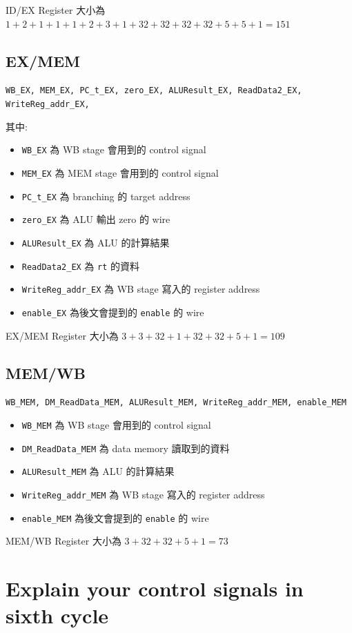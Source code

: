 \documentclass[twocolumn]{extarticle}
\begin{document}
ID/EX Register 大小為 $1+2+1+1+1+2+3+1+32+32+32+32+5+5+1 = 151$

\subsection{EX/MEM}

\texttt{WB\_EX, MEM\_EX, PC\_t\_EX, zero\_EX, ALUResult\_EX, ReadData2\_EX, WriteReg\_addr\_EX, }

其中:
\begin{itemize}
\item \texttt{WB\_EX} 為 WB stage 會用到的 control signal
\item \texttt{MEM\_EX} 為 MEM stage 會用到的 control signal
\item \texttt{PC\_t\_EX} 為 branching 的 target address
\item \texttt{zero\_EX} 為 ALU 輸出 zero 的 wire
\item \texttt{ALUResult\_EX} 為 ALU 的計算結果
\item \texttt{ReadData2\_EX} 為 \texttt{rt} 的資料
\item \texttt{WriteReg\_addr\_EX} 為 WB stage 寫入的 register address
\item \texttt{enable\_EX} 為後文會提到的 \texttt{enable} 的 wire
\end{itemize}

EX/MEM Register 大小為 $3+3+32+1+32+32+5+1=109$

\subsection{MEM/WB}

\texttt{WB\_MEM, DM\_ReadData\_MEM, ALUResult\_MEM, WriteReg\_addr\_MEM, enable\_MEM}
\begin{itemize}
\item \texttt{WB\_MEM} 為 WB stage 會用到的 control signal
\item \texttt{DM\_ReadData\_MEM} 為 data memory 讀取到的資料
\item \texttt{ALUResult\_MEM} 為 ALU 的計算結果
\item \texttt{WriteReg\_addr\_MEM} 為 WB stage 寫入的 register address
\item \texttt{enable\_MEM} 為後文會提到的 \texttt{enable} 的 wire
\end{itemize}

MEM/WB Register 大小為 $3+32+32+5+1=73$

\section{Explain your control signals in sixth cycle}
\end{document}
